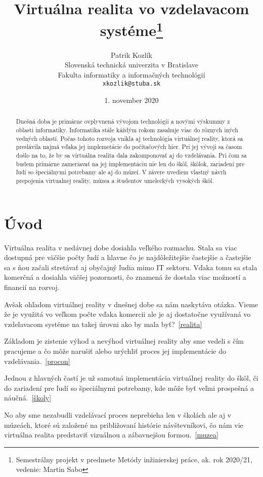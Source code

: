 \documentclass[10pt,twoside,slovak,a4paper]{article}
\title{Virtuálna realita vo vzdelavacom systéme\thanks{Semestrálny projekt v predmete Metódy inžinierskej práce, ak. rok 2020/21, vedenie: Martin Sabo}} %
\author{Patrik Kozlík\\[2pt]
	{\small Slovenská technická univerzita v Bratislave}\\
	{\small Fakulta informatiky a informačných technológií}\\
	{\small \texttt{xkozlik@stuba.sk}}
	}
\date{\small 1. november 2020} %
\begin{document}
\maketitle

\begin{abstract}
Dnešná doba je primárne ovplyvnená vývojom technológii a novými výskummy z oblasti informatiky. Informatika stále káždým rokom zasahuje
viac do rôznych iných vedných oblastí. Počas tohoto rozvoja vnikla aj technológia virtuálnej reality, ktorá sa preslávila najmä vďaka jej
implemetácie do počítačových hier. Pri jej vývoji sa časom došlo na to, že by sa virtuálna realita dala zakomponovať aj do vzdelávania. 
Pri čom sa budem primárne zameriavať na jej implementáciu nie len do škôl, škôlok, zariadení pre ľudí so špeciálnymi potrebamy ale aj do múzeí. V závere uvediem vlastný návrh prepojenia virtualnej reality, múzea a študentov umeleckých vysokých škôl.   	
\end{abstract}



\section{Úvod}

Virtuálna realita v nedávnej dobe dosiahla veľkého rozmachu. Stala sa viac dostupná pre väčšie počty ľudí a hlavne čo je najdôležitejšie 
častejšie a častejšie sa s ňou začali stretávať aj obyčajný ľudia mimo IT sektoru. Vďaka tomu sa stala komerčná a dosiahla väčšej pozornosti,
čo znamená že dostala viac možností a financií na rozvoj. 

Avšak ohľadom virtuálnej reality v dnešnej dobe sa nám naskytáva otázka. Vieme že je využitá vo veľkom počte vďaka komercii ale je aj dostatočne využívaná vo vzdelavacom systéme na takej úrovni ako by mala byť?~\ref{realita}

Základom je zistenie výhod a nevýhod virtuálnej reality aby sme vedeli s čím pracujeme a čo môže narušiť alebo urýchliť proces 
jej implementácie do vzdelávania.~\ref{procon}

Jednou z hlavných častí je už samotná implementácia virtuálnej reality do škôl, či do zariadení pre ľudí so špeciálnymi potrebamy,
kde môže byť veľmi prospešná a náučná.~\ref{školy}

No aby sme nezabudli vzdelávací proces neprebieha len v školách ale aj v múzeách, ktoré sú založené na približovaní histórie návštevníkovi, čo nám vie virtuálna realita predstaviť vizuálnou a zábavnejšou formou.~\ref{muzea}
\end{document}
